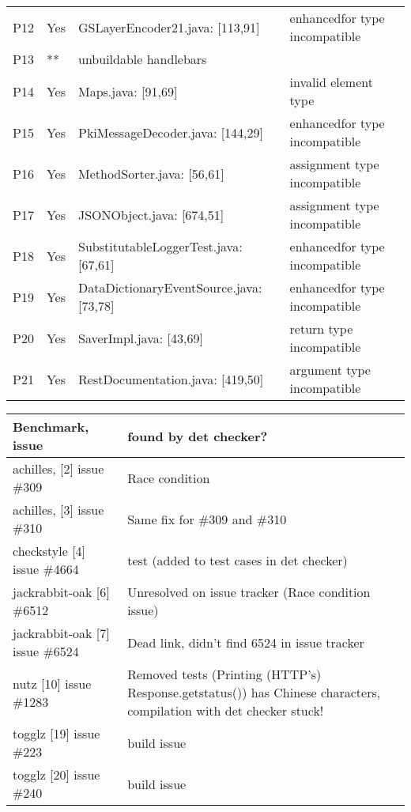 \begin{table}[]
\begin{tabular}{|p{1.5cm}|p{1cm}|p{5cm}|p{5cm}|}
        P12 & Yes  & GSLayerEncoder21.java: [113,91]  & enhancedfor type incompatible \\
        P13 & ** & unbuildable handlebars &  \\
        P14 & Yes  & Maps.java: [91,69] & invalid element type   \\
        P15 & Yes & PkiMessageDecoder.java: [144,29]  &  enhancedfor type incompatible  \\
        P16 & Yes & MethodSorter.java: [56,61]  & assignment type incompatible  \\
        P17 & Yes & JSONObject.java: [674,51]  & assignment type incompatible  \\
        P18 & Yes & SubstitutableLoggerTest.java: [67,61]   & enhancedfor type incompatible  \\
        P19 & Yes & DataDictionaryEventSource.java: [73,78]  &  enhancedfor type incompatible  \\
        P20 & Yes & SaverImpl.java: [43,69]  &  return type incompatible  \\
        P21 & Yes & RestDocumentation.java: [419,50] &  argument type incompatible   \\ \hline
    \end{tabular}
\end{table}

\begin{table}[]
    \begin{tabular}{|l|p{5cm}|}
        \hline
        Benchmark, issue & found by det checker? \\ \hline
        achilles, [2] issue \#309 &  Race condition\\ \hline
        achilles, [3] issue \#310 & Same fix for \#309 and \#310 \\ \hline
        checkstyle [4] issue \#4664&test (added to test cases in det checker) \\ \hline
        jackrabbit-oak [6] \#6512&  Unresolved on issue tracker (Race condition issue) \\ \hline
        jackrabbit-oak [7] issue \#6524&  Dead link, didn't find 6524 in issue tracker \\ \hline
        nutz [10] issue \#1283 &  Removed tests (Printing (HTTP's) Response.getstatus()) has Chinese characters,
        compilation with det checker stuck!\\ \hline
        togglz [19] issue \#223 & build issue \\ \hline
        togglz [20] issue \#240 &  build issue\\ \hline
    \end{tabular}
\end{table}
